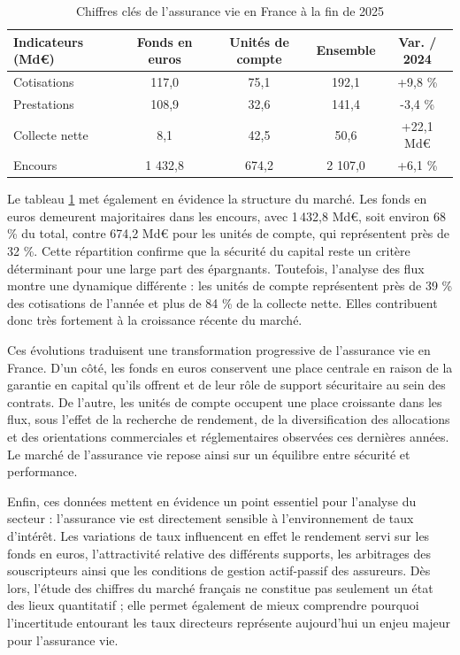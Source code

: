 \begin{table}[h]
    \centering
    \renewcommand{\arraystretch}{1.15}
    \begin{tabular}{lcccc}
        \toprule
        \textbf{Indicateurs (Md€)} & \textbf{Fonds en euros} & \textbf{Unités de compte} & \textbf{Ensemble} & \textbf{Var. / 2024} \\
        \midrule
        Cotisations    & 117,0   & 75,1  & 192,1   & +9,8 \% \\
        Prestations    & 108,9   & 32,6  & 141,4   & -3,4 \% \\
        Collecte nette & 8,1     & 42,5  & 50,6    & +22,1 Md€ \\
        \midrule
        Encours        & 1 432,8 & 674,2 & 2 107,0 & +6,1 \% \\
        \bottomrule
    \end{tabular}
    \caption{Chiffres clés de l'assurance vie en France à la fin de 2025}
    \label{tab:chiffres_cles_assurance_vie_france}
\end{table}

Le tableau \ref{tab:chiffres_cles_assurance_vie_france} met également en évidence la structure du marché. Les fonds en euros demeurent majoritaires dans les encours, avec 1\,432,8 Md€, soit environ 68 \% du total, contre 674,2 Md€ pour les unités de compte, qui représentent près de 32 \%. Cette répartition confirme que la sécurité du capital reste un critère déterminant pour une large part des épargnants. Toutefois, l'analyse des flux montre une dynamique différente : les unités de compte représentent près de 39 \% des cotisations de l'année et plus de 84 \% de la collecte nette. Elles contribuent donc très fortement à la croissance récente du marché.

Ces évolutions traduisent une transformation progressive de l'assurance vie en France. D'un côté, les fonds en euros conservent une place centrale en raison de la garantie en capital qu'ils offrent et de leur rôle de support sécuritaire au sein des contrats. De l'autre, les unités de compte occupent une place croissante dans les flux, sous l'effet de la recherche de rendement, de la diversification des allocations et des orientations commerciales et réglementaires observées ces dernières années. Le marché de l'assurance vie repose ainsi sur un équilibre entre sécurité et performance.

Enfin, ces données mettent en évidence un point essentiel pour l'analyse du secteur : l'assurance vie est directement sensible à l'environnement de taux d'intérêt. Les variations de taux influencent en effet le rendement servi sur les fonds en euros, l'attractivité relative des différents supports, les arbitrages des souscripteurs ainsi que les conditions de gestion actif-passif des assureurs. Dès lors, l'étude des chiffres du marché français ne constitue pas seulement un état des lieux quantitatif ; elle permet également de mieux comprendre pourquoi l'incertitude entourant les taux directeurs représente aujourd'hui un enjeu majeur pour l'assurance vie.

